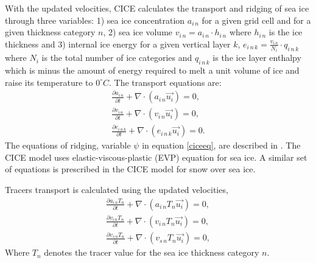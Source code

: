 With the updated velocities, CICE calculates the transport and ridging of sea ice through three variables: 1) sea ice concentration $a_{i\,n}$ for a given grid cell and for a given thickness category $n$, 2) sea ice volume $v_{i\,n} = a_{i\,n}\cdot h_{i\,n}$ where $h_{i\,n}$ is the ice thickness and 3) internal ice energy for a given vertical layer $k$, $e_{i\,n\,k}=\frac{v_{i\,n}}{N_i}\cdot q_{i\,n\,k}$ where $N_i$ is the total number of ice categories and $q_{i\,n\,k}$ is the ice layer enthalpy which is minus the amount of energy required to melt a unit volume of ice and raise its temperature to $0^\circ C$. The transport equations are:
\begingroup \belowdisplayskip=0pt \abovedisplayskip=0pt
\begin{gather}
\frac{\partial a_{i\,n}}{\partial t}+\nabla\cdot (a_{i\,n} \vec{u_i}) = 0,\\
\frac{\partial v_{i\,n}}{\partial t}+\nabla\cdot (v_{i\,n} \vec{u_i}) = 0,\\
\frac{\partial e_{i\,n\,k}}{\partial t}+\nabla\cdot (e_{i\,n\,k} \vec{u_i}) = 0.
\end{gather}
\endgroup
The equations of ridging, variable $\psi$ in equation \eqref{ciceeq}, are described in \citet{JGRC:JGRC10227}. The CICE model uses elastic-viscous-plastic (EVP) equation for sea ice. A similar set of equations is prescribed in the CICE model for snow over sea ice.

Tracers transport is calculated using the updated velocities,
\begingroup \belowdisplayskip=0pt \abovedisplayskip=0pt
\begin{gather}
\frac{\partial a_{i\,n}T_n}{\partial t}+\nabla\cdot (a_{i\,n} T_n\vec{u_i}) = 0,\\
\frac{\partial v_{i\,n}T_n}{\partial t}+\nabla\cdot (v_{i\,n}T_n \vec{u_i}) = 0,\\
\frac{\partial v_{s\,n}T_n}{\partial t}+\nabla\cdot (v_{s\,n}T_n \vec{u_i}) = 0,
\end{gather}
\endgroup
Where $T_n$ denotes the tracer value for the sea ice thickness category $n$.

